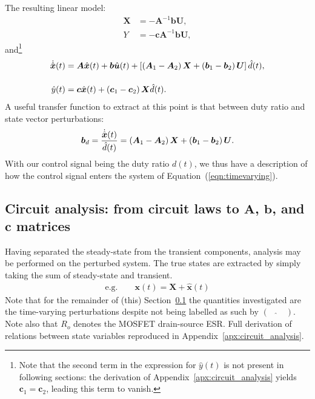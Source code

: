 \newpar
The resulting linear model:
\begin{align}
\boldsymbol{X} &= \minus \boldsymbol{A}^{-1} \boldsymbol{b} \boldsymbol{U},
\nonumber
\\[11pt]
Y &= \minus \boldsymbol{c} \boldsymbol{A}^{-1} \boldsymbol{b} \boldsymbol{U},
\label{eqn:modelY}
\end{align}
and\footnote{Note that the second term in the expression for $\hat{y}(t)$ is not present in following sections: the derivation of Appendix~\ref{apx:circuit_analysis} yields $\boldsymbol{c}_1 = \boldsymbol{c}_2$, leading this term to vanish.}
\begin{align}
\dot{\hat{\boldsymbol{x}}}(t)
&= \boldsymbol{A} \hat{\boldsymbol{x}}(t) + \boldsymbol{b} \hat{\boldsymbol{u}}(t)
+ \left[\left(\boldsymbol{A}_1 - \boldsymbol{A}_2\right)\boldsymbol{X} + \left(\boldsymbol{b}_1 - \boldsymbol{b}_2\right)\boldsymbol{U}\right] \hat{d}(t),\nonumber
\\[11pt]
\hat{y}(t) &= \boldsymbol{c} \hat{\boldsymbol{x}}(t) + \left(\boldsymbol{c}_1 - \boldsymbol{c}_2\right) \boldsymbol{X} \hat{d}(t).\label{eqn:timevarying}
\end{align}
A useful transfer function to extract at this point is that between duty ratio and state vector perturbations:
\begin{align}
\boldsymbol{b}_d = \frac{\dot{\hat{\boldsymbol{x}}}(t)}{\hat{d}(t)} = \left(\boldsymbol{A}_1 - \boldsymbol{A}_2\right)\boldsymbol{X} + \left(\boldsymbol{b}_1 - \boldsymbol{b}_2\right)\boldsymbol{U}.
\label{eqn:bD}
\end{align}
With our control signal being the duty ratio $d(t)$, we thus have a description of how the control signal enters the system of Equation~(\ref{eqn:timevarying}).
\subsection{Circuit analysis: from circuit laws to $\boldsymbol{A}$, $\boldsymbol{b}$, and $\boldsymbol{c}$ matrices}\label{sec:circuitanalysis}
Having separated the steady-state from the transient components, analysis may be performed on the perturbed system. The true states are extracted by simply taking the sum of steady-state and transient.
\begin{align*}
\text{e.g.} \qquad \boldsymbol{x}(t) = \boldsymbol{X} + \hat{\boldsymbol{x}}(t)
\end{align*}
Note that for the remainder of (this) Section~\ref{sec:circuitanalysis} the quantities investigated are the time-varying perturbations despite not being labelled as such by $(\quad\hat{}\quad)$.
\newpar
Note also that $R_o$ denotes the MOSFET drain-source ESR.
\newpar
Full derivation of relations between state variables reproduced in Appendix~\ref{apx:circuit_analysis}.
